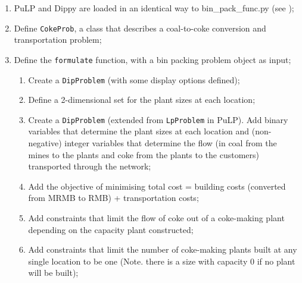 \begin{enumerate}[leftmargin=0cm,itemindent=0.75cm,labelwidth=.5cm,labelsep=.25cm,labelindent=0cm,align=left]
\item PuLP and Dippy are loaded in an identical way to bin\_pack\_func.py (see );

\item Define \lstinline{CokeProb}, a class that describes a coal-to-coke conversion and transportation problem;


\item Define the \lstinline{formulate} function, with a bin packing problem object as input;
\begin{enumerate}[leftmargin=0cm,itemindent=0.75cm,labelwidth=.5cm,labelsep=.25cm,labelindent=0cm,align=left]
\item Create a \lstinline{DipProblem} (with some display options defined);


\item \label{itm:2d} Define a 2-dimensional set for the plant sizes at each location;


\item Create a \texttt{DipProblem} (extended from \texttt{LpProblem} in PuLP). Add binary variables that determine the plant sizes at each location and (non-negative) integer variables that determine the flow (in coal from the mines to the plants and coke from the plants to the customers) transported through the network;


\item Add the objective of minimising total cost = building costs (converted from MRMB to RMB) + transportation costs;


\item Add constraints that limit the flow of coke out of a coke-making plant depending on the capacity plant constructed;


\item Add constraints that limit the number of coke-making plants built at any single location to be one (Note. there is a size with capacity 0 if no plant will be built);



\end{enumerate}
\end{enumerate}
